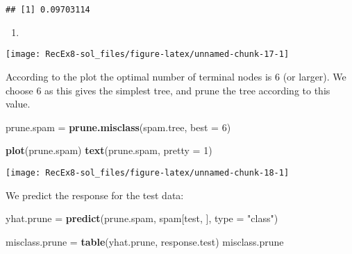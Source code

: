 \documentclass[]{article}
\newenvironment{Shaded}{\begin{snugshade}}{\end{snugshade}}
\newcommand{\DataTypeTok}[1]{\textcolor[rgb]{0.13,0.29,0.53}{#1}}
\newcommand{\DecValTok}[1]{\textcolor[rgb]{0.00,0.00,0.81}{#1}}
\newcommand{\KeywordTok}[1]{\textcolor[rgb]{0.13,0.29,0.53}{\textbf{#1}}}
\newcommand{\NormalTok}[1]{#1}
\newcommand{\OperatorTok}[1]{\textcolor[rgb]{0.81,0.36,0.00}{\textbf{#1}}}
\newcommand{\StringTok}[1]{\textcolor[rgb]{0.31,0.60,0.02}{#1}}
\begin{document}
\begin{verbatim}
## [1] 0.09703114
\end{verbatim}

\begin{enumerate}
\def\labelenumi{\alph{enumi})}
\setcounter{enumi}{4}
\item
\end{enumerate}

\begin{Shaded}
\end{Shaded}

\texttt{[image: RecEx8-sol\_files/figure-latex/unnamed-chunk-17-1]}

According to the plot the optimal number of terminal nodes is 6 (or
larger). We choose 6 as this gives the simplest tree, and prune the tree
according to this value.

\begin{Shaded}
\begin{Highlighting}[]
\NormalTok{prune.spam =}\StringTok{ }\KeywordTok{prune.misclass}\NormalTok{(spam.tree, }\DataTypeTok{best =} \DecValTok{6}\NormalTok{)}

\KeywordTok{plot}\NormalTok{(prune.spam)}
\KeywordTok{text}\NormalTok{(prune.spam, }\DataTypeTok{pretty =} \DecValTok{1}\NormalTok{)}
\end{Highlighting}
\end{Shaded}

\texttt{[image: RecEx8-sol\_files/figure-latex/unnamed-chunk-18-1]}

We predict the response for the test data:

\begin{Shaded}
\begin{Highlighting}[]
\NormalTok{yhat.prune =}\StringTok{ }\KeywordTok{predict}\NormalTok{(prune.spam, spam[test, ], }\DataTypeTok{type =} \StringTok{"class"}\NormalTok{)}

\NormalTok{misclass.prune =}\StringTok{ }\KeywordTok{table}\NormalTok{(yhat.prune, response.test)}
\NormalTok{misclass.prune}
\end{Highlighting}
\end{Shaded}
\end{document}
